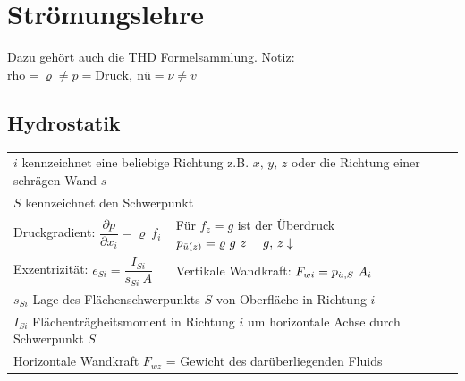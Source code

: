 \setcounter{section}{1} %

\section{Strömungslehre}
	Dazu gehört auch die THD Formelsammlung. Notiz: $ \text{rho} = \varrho \neq p = \text{Druck}, \ \text{nü} = \nu \neq v  $

\subsection{Hydrostatik}

	\begin{flushleft}
		\setlength{\tabcolsep}{1.5em} %
		{\renewcommand{\arraystretch}{1.5}
		\begin{tabular}{ll}
			\multicolumn{2}{l}{$ i $ kennzeichnet eine beliebige Richtung z.B. $ x,\, y,\, z $ oder die Richtung einer schrägen Wand $ s $}                                  \\
			\multicolumn{2}{l}{$ S $ kennzeichnet den Schwerpunkt}                                                                                                           \\
			Druckgradient: $ \dfrac{\partial p}{\partial x_i} =  \varrho\ f_i$ & Für $ f_z = g $ ist der Überdruck $ p_{\ddot{u}(z)} =  \varrho\ g\ z \quad \ g,\, z \downarrow $ \\
			Exzentrizität:       $ e_{Si} = \dfrac{I_{Si}}{s_{Si} \ A}$        & Vertikale Wandkraft: $ F_{wi} = p_{\ddot{u},S} \ A_i $                                           \\
			\multicolumn{2}{l}{$ s_{Si} $ Lage des Flächenschwerpunkts $ S $ von Oberfläche in Richtung $ i $}                                                               \\
			\multicolumn{2}{l}{$ I_{Si} $ Flächenträgheitsmoment in Richtung $ i $ um horizontale Achse durch Schwerpunkt $ S $ }                                            \\
			\multicolumn{2}{l}{Horizontale Wandkraft 	$ F_{wz} $ = Gewicht des darüberliegenden Fluids}
		\end{tabular}
		}
	\end{flushleft}
%
	\vspace{-0.8cm}
%
